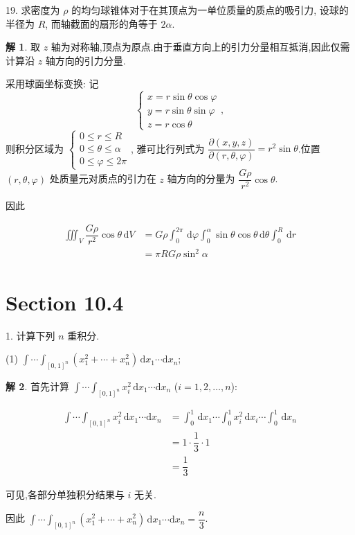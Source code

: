 \documentclass[a4paper,12pt]{article}
\theoremstyle{definition}
\newtheorem*{sol}{解}
\begin{document}
19. 求密度为 $\rho$ 的均匀球锥体对于在其顶点为一单位质量的质点的吸引力, 设球的半径为 $R$, 而轴截面的扇形的角等于 $2\alpha$.
\begin{sol}
    取 $z$ 轴为对称轴,顶点为原点.由于垂直方向上的引力分量相互抵消,因此仅需计算沿 $z$ 轴方向的引力分量.

    采用球面坐标变换: 记
    $$\begin{cases}
        x=r\sin\theta\cos\varphi \\
        y=r\sin\theta\sin\varphi \\
        z=r\cos\theta
    \end{cases},$$
    则积分区域为 $\begin{cases}
        0\leq r \leq R           \\
        0\leq \theta \leq \alpha \\
        0\leq \varphi \leq 2\pi
    \end{cases}$, 雅可比行列式为 $\dfrac{\partial(x,y,z)}{\partial(r,\theta,\varphi)}=r^2\sin\theta$.位置 $(r,\theta,\varphi)$ 处质量元对质点的引力在 $z$ 轴方向的分量为 $\dfrac{G\rho}{r^2}\cos\theta$.

    因此

    \begin{align*}
        \iiint_V\dfrac{G\rho}{r^2}\cos\theta\,\mathrm{d}V
         & =G\rho\int_0^{2\pi}\,\mathrm{d}\varphi\int_0^{\alpha}\sin\theta\cos\theta\,\mathrm{d}\theta\int_0^R\,\mathrm{d}r \\
         & =\pi RG\rho\sin^2\alpha
    \end{align*}
\end{sol}

\section*{Section 10.4}

1. 计算下列 $n$ 重积分.

(1) $\displaystyle\int \cdots \int_{[0,1]^n} (x_1^2 + \cdots + x_n^2) \, \mathrm{d}x_1 \cdots \mathrm{d}x_n$;
\begin{sol}
    首先计算 $\int \cdots \int_{[0,1]^n} x_i^2 \, \mathrm{d}x_1 \cdots \mathrm{d}x_n$ ($i=1,2,\dots,n$):

    \begin{align*}
        \int \cdots \int_{[0,1]^n} x_i^2 \, \mathrm{d}x_1 \cdots \mathrm{d}x_n
         & =\int_0^1\,\mathrm{d}x_1\cdots\int_0^1 x_i^2\,\mathrm{d}x_i\cdots\int_0^1\,\mathrm{d}x_n \\
         & =1\cdot\dfrac{1}{3}\cdot 1                                                                \\
         & =\dfrac{1}{3}
    \end{align*}

    可见,各部分单独积分结果与 $i$ 无关.

    因此 $\int \cdots \int_{[0,1]^n} (x_1^2 + \cdots + x_n^2) \, \mathrm{d}x_1 \cdots \mathrm{d}x_n=\dfrac{n}{3}$.
\end{sol}
\end{document}
